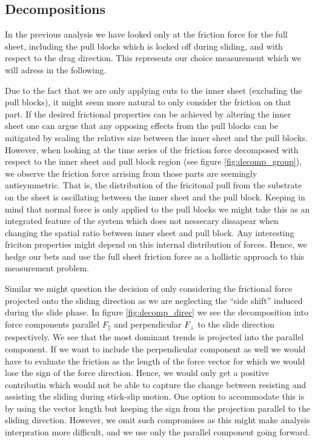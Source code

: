 \subsection{Decompositions}
In the previous analysis we have looked only at the friction force for the full
sheet, including the pull blocks which is locked off during sliding, and with
respect to the drag direction. This represents our choice measurement which we will adress in the following.

Due to the fact that we are only applying cuts to the inner sheet (excluding the
pull blocks), it might seem more natural to only consider the friction on that
part. If the desired frictional properties can be achieved by altering the inner
sheet one can argue that any opposing effects from the pull blocks can be
mitigated by scaling the relative size between the inner sheet and the pull
blocks. However, when looking at the time series of the friction force
decomposed with respect to the inner sheet and pull block region (see figure
\ref{fig:decomp_group}), we observe the friction force arrising from those parts
are seemingly antisymmetric. That is, the distribution of the fricitonal pull from the substrate on the sheet is
oscillating between the inner sheet and the pull block. Keeping in mind that 
normal force is only applied to the pull blocks we might take this as an
integrated feature of the system which does not nessecary dissapear when changing the spatial ratio between inner sheet and pull block. Any interesting friciton properties might depend on this internal distribution of forces. Hence, we hedge our bets
and use the full sheet friction force as a hollistic approach to this measurement
problem.

Similar we might question the decision of
only considering the frictional force projected onto the sliding direction as
we are neglecting the ``side shift'' induced during the slide phase. In figure \ref{fig:decomp_direc} we see the decomposition into force components parallel $F_{\parallel}$ and perpendicular $F_{\perp}$ to the slide direction respectively. We see that the most dominant trends is projected into the parallel component. If we want to include the perpendicular component as well we would have to evaluate the friction as the length of the force vector for which we would lose the sign of the force direction. Hence, we would only get a positive contributin which would not be able to capture the change between resisting and assisting the sliding during stick-slip motion. One option to accommodate this is by using the vector length but keeping the sign from the projection parallel to the sliding direction. However, we omit such compromises as this might make analysis interpration more difficult, and we use only the parallel component going forward. 

